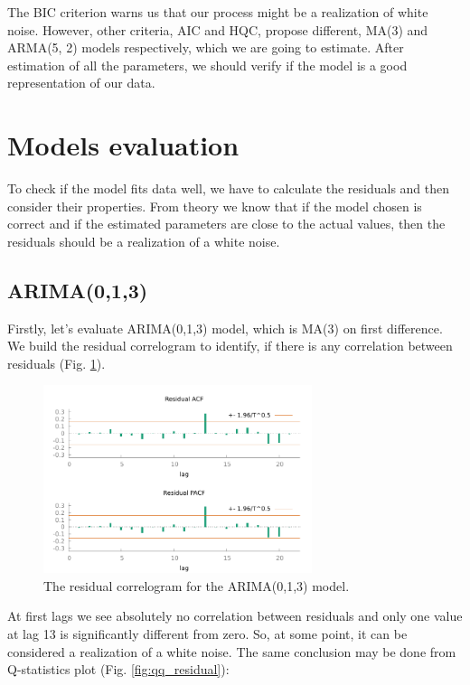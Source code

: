 \documentclass[14pt,a4paper]{extarticle}
\newcounter{e}
\numberwithin{equation}{section}
\numberwithin{figure}{section}
\begin{document}
The BIC criterion warns us that our process might be a realization of white noise. However, other criteria, AIC and HQC, propose different, MA(3) and ARMA(5, 2) models respectively, which we are going to estimate. After estimation of all the parameters, we should verify if the model is a good representation of our data. 


\section{Models evaluation}
To check if the model fits data well, we have to calculate the residuals and then consider their properties.
From theory we know that if the model chosen is
correct and if the estimated parameters are close to the
actual values, then the residuals should be a realization of a
white noise.

\subsection{ARIMA(0,1,3)}
Firstly, let's evaluate ARIMA(0,1,3) model, which is MA(3) on first difference. We build the residual correlogram to identify, if there is any correlation between residuals (Fig. \ref{fig:ma_3_residual_corr}).

\begin{figure}[h!]
	\centering
	\includegraphics[height=0.3\textheight, width=0.7\textwidth]{resources/ma_3_residual_corr.pdf}
    \caption{The residual correlogram for the ARIMA(0,1,3) model.}
	\label{fig:ma_3_residual_corr}
\end{figure}

At first lags we see absolutely no correlation between residuals and only one value at lag 13 is significantly different from zero. So, at some point, it can be considered a realization of a white noise.
The same conclusion may be done from Q-statistics plot (Fig. \ref{fig:qq_residual}): %
\end{document}
